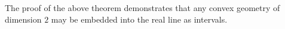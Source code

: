 \documentclass[12pt]{elsarticle}
\theoremstyle{plain}
\newtheorem{theorem}{Theorem}
\theoremstyle{definition}
\newcommand{\F}{\mathcal{F}}
\newcommand{\cgeom}{\mathcal{L}}
\DeclareMathOperator{\Hull}{Conv}
\DeclareMathOperator{\cdim}{cdim}
\DeclareMathOperator{\Cir}{Cir}
\begin{document}
The proof of the above theorem demonstrates that any convex geometry of dimension $2$ may be embedded into the real line as intervals. %
%
%
\end{document}

